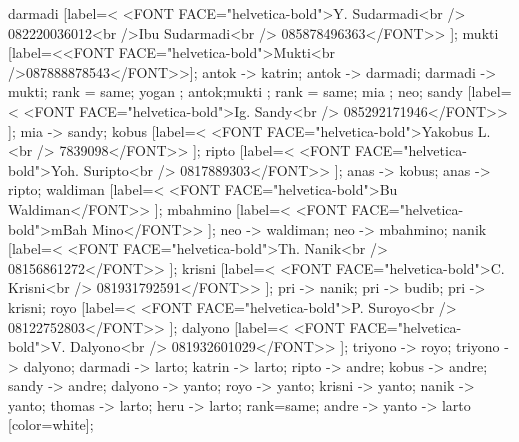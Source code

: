 {    darmadi [label=< <FONT FACE="helvetica-bold">Y. Sudarmadi<br />  082220036012<br />Ibu Sudarmadi<br />  085878496363</FONT>> ];
    mukti	[label=<<FONT FACE="helvetica-bold">Mukti<br />087888878543</FONT>>];
    antok -> katrin;
    antok -> darmadi;    
    darmadi -> mukti;
    {rank = same;  yogan ;  antok;mukti ; }
    {rank = same;  mia ;  neo;}
    sandy [label=< <FONT FACE="helvetica-bold">Ig. Sandy<br />  085292171946</FONT>> ]; 
    mia -> sandy;
    kobus [label=< <FONT FACE="helvetica-bold">Yakobus L.<br />  7839098</FONT>> ]; 
    ripto [label=< <FONT FACE="helvetica-bold">Yoh. Suripto<br />  0817889303</FONT>> ]; 
    anas -> kobus;
    anas -> ripto;
    waldiman [label=< <FONT FACE="helvetica-bold">Bu Waldiman</FONT>> ];
    mbahmino [label=< <FONT FACE="helvetica-bold">mBah Mino</FONT>> ];
    neo -> waldiman;
    neo -> mbahmino;
    nanik [label=< <FONT FACE="helvetica-bold">Th. Nanik<br />  08156861272</FONT>> ]; 
    krisni [label=< <FONT FACE="helvetica-bold">C. Krisni<br />  081931792591</FONT>> ]; 
    pri -> nanik;
    pri -> budib;
    pri -> krisni;
    royo [label=< <FONT FACE="helvetica-bold">P. Suroyo<br />  08122752803</FONT>> ];
    dalyono [label=< <FONT FACE="helvetica-bold">V. Dalyono<br />  081932601029</FONT>> ];
    triyono -> royo;
    triyono -> dalyono;
    darmadi -> larto;
    katrin -> larto;
    ripto -> andre;
    kobus -> andre;
    sandy -> andre;
    dalyono -> yanto;
    royo -> yanto;
    krisni -> yanto;
    nanik -> yanto;
    thomas -> larto;
    heru -> larto;
    {
    rank=same;
    andre -> yanto -> larto [color=white];
    }
}
